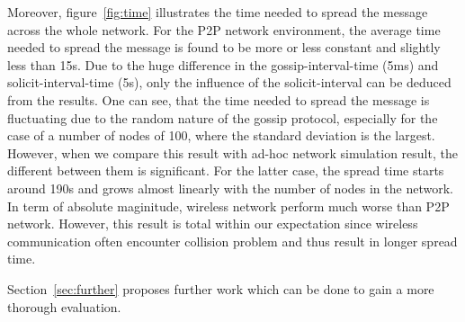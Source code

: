%
%

Moreover, figure~\ref{fig:time} illustrates the time needed to spread the message across the whole network. For the P2P network environment, the average time needed to spread the message is found to be more or less constant and slightly less than 15s. Due to the huge difference in the gossip-interval-time (5ms) and solicit-interval-time (5s), only the influence of the solicit-interval can be deduced from the results. One can see, that the time needed to spread the message is fluctuating due to the random nature of the gossip protocol, especially for the case of a number of nodes of 100, where the standard deviation is the largest. However, when we compare this result with ad-hoc network simulation result, the different between them is significant. For the latter case, the spread time starts around 190s and grows almost linearly with the number of nodes in the network. In term of absolute maginitude, wireless network perform much worse than P2P network. However, this result is total within our expectation since wireless communication often encounter collision problem and thus result in longer spread time.


Section~\ref{sec:further} proposes further work which can be done to gain a more thorough evaluation.




